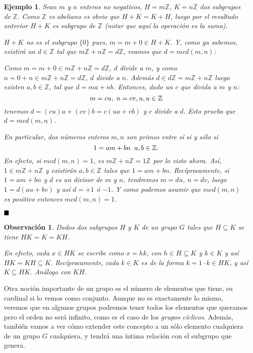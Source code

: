 \documentclass[12pt]{article}
\newtheorem{example}{Ejemplo}[theorem]
\newtheorem{observation}{Observación}[theorem]
\begin{document}
\begin{example} Sean $m$ y $n$ enteros no negativos, $H = m\mathbb{Z}$, $K = n\mathbb{Z}$ dos subgrupos de $\mathbb{Z}$. Como $\mathbb{Z}$ es abeliano es obvio que $H+K = K+H$, luego por el resultado anterior $H+K$ es subgrupo de $\mathbb{Z}$ (notar que aquí la operación es la suma).


$H+K$ no es el subgrupo $\lbrace 0 \rbrace$ pues, $m = m + 0 \in H + K$. Y, como ya sabemos, existirá un $d \in \mathbb{Z}$ tal que $m\mathbb{Z}+n\mathbb{Z} = d\mathbb{Z}$, veamos que $d = mcd(m,n)$:


Como $m = m + 0 \in m\mathbb{Z}+n\mathbb{Z} = d\mathbb{Z}$, $d$ divide a $m$, y como $n = 0 + n \in m\mathbb{Z}+n\mathbb{Z} = d\mathbb{Z}$, $d$ divide a $n$. Además $d \in d\mathbb{Z} = m\mathbb{Z} + n\mathbb{Z}$ luego existen $a,b \in \mathbb{Z}$, tal que $d = ma + nb$. Entonces, dado un $c$ que divida a $m$ y $n$:
$$m = cu,\hspace{0.1cm} n = cv, u, u \in \mathbb{Z}$$ tenemos $d = (cu)a + (cv)b = c(ua + vb)$ y $c$ divide a $d$. Esto prueba que $d = mcd(m,n)$. 

En particular, dos números enteros $m,n$ son primos entre sí si y sólo si $$1 = am + bn \hspace{0.2cm} a,b \in \mathbb{Z}.$$ En efecto, si $mcd(m,n) = 1$, es $m\mathbb{Z} + n\mathbb{Z} = 1\mathbb{Z}$ por lo visto ahora. Así, $1 \in m\mathbb{Z}+n\mathbb{Z}$ y existirán $a,b \in \mathbb{Z}$ tales que $1 = am + bn$. Recíprocamente, si $1 = am + bn$ y $d$ es un divisor de $m$ y $n$, tendremos $m = du$, $n = dv$, luego $1 = d(au + bv)$ y así $d = +1$ ó $-1$. Y como podemos asumir que $mcd(m,n)$ es positivo entonces $mcd(m,n) = 1$.
\end{example}

$\hfill \blacksquare$

\begin{observation} Dados dos subgrupos $H$ y $K$ de un grupo $G$ tales que $H \subseteq K$ se tiene $HK = K = KH$.

En efecto, cada $x \in HK$ se escribe como $x=hk$, con $h \in H \subseteq K$ y $k \in K$ y así $HK = KH \subseteq K$. Recíprocamente, cada $k \in K$ es de la forma $k  = 1 \cdot k \in HK$, y así $K \subseteq HK$. Análogo con $KH$.
\end{observation}

Otra noción importante de un grupo es el número de elementos que tiene, su cardinal si lo vemos como conjunto.  Aunque no es exactamente lo mismo, veremos que en algunos grupos podremos tener todos los elementos que queramos pero el orden no será infinito, como es el caso de los \textit{grupos cíclicos}. Además, también vamos a ver cómo extender este concepto a un sólo elemento cualquiera de un grupo $G$ cualquiera, y tendrá una íntima relación con el subgrupo que genera.
\end{document}
